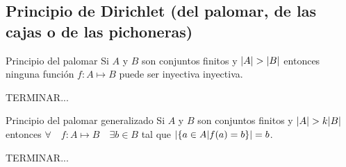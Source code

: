 	\subsection{Principio de Dirichlet (del palomar, de las cajas o de las pichoneras)}
		\begin{theorem}{Principio del palomar}
			Si $A$ y $B$ son conjuntos finitos y $\abs{A}>\abs{B}$ entonces ninguna función $f:A\longmapsto B$ puede ser inyectiva inyectiva.
		\end{theorem}    
		\begin{demostration}{}
			TERMINAR...
		\end{demostration}
		\begin{theorem}{Principio del palomar generalizado}
			Si $A$ y $B$ son conjuntos finitos y $\abs{A}>k\abs{B}$ entonces $\forall\quad f:A\longmapsto B\quad\exists b\in B$ tal que $\abs{\{a\in A|f(a)=b\}}=b$.
		\end{theorem}    
		\begin{demostration}{}
			TERMINAR...
		\end{demostration}